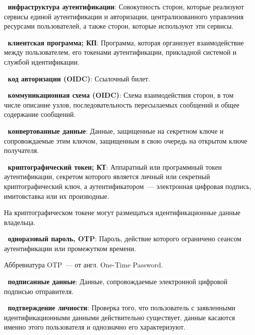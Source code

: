 
{\bf \thedefctr~инфраструктура аутентификации}:
Совокупность сторон, которые реализуют сервисы единой аутентификации и 
авторизации, централизованного управления ресурсами пользователей,
а также сторон, которые используют эти сервисы.

{\bf \thedefctr~клиентская программа; КП}:
Программа, которая организует взаимодействие между пользователем,
его токенами аутентификации, прикладной системой и службой идентификации.


{\bf \thedefctr~код авторизации (OIDC)}:
Ссылочный билет.

{\bf \thedefctr~коммуникационная схема (OIDC)}:
Схема взаимодействия сторон, в том числе описание узлов,
последовательность пересылаемых сообщений и общее 
содержание сообщений.

{\bf \thedefctr~конвертованные данные}: %
Данные, защищенные на секретном ключе и сопровождаемые этим ключом, 
защищенным в свою очередь на открытом ключе получателя.

{\bf \thedefctr~криптографический токен; КТ}:
Аппаратный или программный токен аутентификации, секретом которого 
является личный или секретный криптографический ключ, а аутентификатором~---  
электронная цифровая подпись, имитовставка или их производные. 

\begin{note*}
На криптографическом токене могут размещаться идентификационные данные 
владельца.
\end{note*}

{\bf \thedefctr~одноразовый пароль, OTP}: %
Пароль, действие которого ограничено сеансом аутентификации или промежутком 
времени.

\begin{note*}
Аббревиатура OTP~--- от англ. One-Time Password.
\end{note*}

{\bf \thedefctr~подписанные данные}: %
Данные, сопровождаемые электронной цифровой подписью отправителя. 

{\bf \thedefctr~подтверждение личности}:
Проверка того, что пользователь с заявленными идентификационными данными
действительно существует, данные касаются именно этого пользователя и однозначно
его характеризуют.


